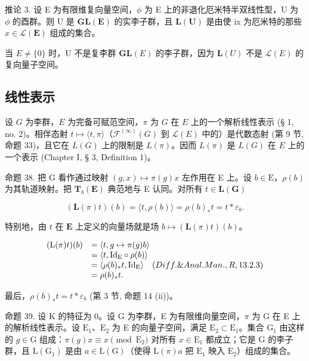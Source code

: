 推论 3. 设 E 为有限维复向量空间，\(\phi\) 为 E 上的非退化厄米特半双线性型，U 为 \(\phi\) 的酉群。则 U 是 \(\mathbf{GL}(\mathbf{E})\) 的实李子群，且 \(\mathbf{L}(\mathbf{U})\) 是由使 ix 为厄米特的那些 \(x \in \mathcal{L}(\mathbf{E})\) 组成的集合。

当 \(E \neq \{0\}\) 时，U 不是复李群 \(\mathbf{GL}(E)\) 的李子群，因为 \(\mathbf{L}(U)\) 不是 \(\mathcal{L}(E)\) 的复向量子空间。

\subsection{线性表示}

设 \(G\) 为李群，\(E\) 为完备可赋范空间，\(\pi\) 为 \(G\) 在 \(E\) 上的一个解析线性表示 (§ 1, no. 2)。相伴态射 \(t \mapsto \langle t, \pi \rangle\)（\(\mathcal{F}^{(\infty)}(G)\) 到 \(\mathcal{L}(E)\) 中的）是代数态射 (第 9 节, 命题 33)，且它在 \(L(G)\) 上的限制是 \(L(\pi)\)。因而 \(L(\pi)\) 是 \(L(G)\) 在 \(E\) 上的一个表示 (Chapter I, § 3, Definition 1)。

命题 38. 把 G 看作通过映射 \((g,x)\mapsto \pi (g)x\) 左作用在 E 上。设 \(b\in \mathrm{E}\)，\(\rho (b)\) 为其轨道映射。把 \(\mathbf{T}_b(\mathbf{E})\) 典范地与 E 认同。对所有 \(t\in \mathbf{L}(\mathbf{G})\)

\[
(\mathbf {L} (\pi) t) (b) = \langle t, \rho (b) \rangle = \rho (b) _ {*} t = t * \varepsilon_ {b}.
\]

特别地，由 \(t\) 在 \(\mathbf{E}\) 上定义的向量场就是场 \(b \mapsto (\mathbf{L}(\pi)t)(b)\)。

\[
\begin{array}{r l} (\mathrm{L} (\pi) t) (b) & = \langle t, g \mapsto \pi (g) b \rangle \\ & = \langle t, \mathrm{Id} _ {\mathrm{E}} \circ \rho (b) \rangle \\ & = \langle \rho (b) _ {*} t, \mathrm{Id} _ {\mathrm{E}} \rangle \quad (Diff. \& Anal. Man., R, 13.2.3) \\ & = \rho (b) _ {*} t. \end{array}
\]

最后，\(\rho(b)_{*}t = t*\varepsilon_{b}\) (第 3 节, 命题 14 (ii))。

命题 39. 设 K 的特征为 0。设 G 为李群，E 为有限维向量空间，\(\pi\) 为 G 在 E 上的解析线性表示。设 \(\mathrm{E}_1\)、\(\mathrm{E}_2\) 为 E 的向量子空间，满足 \(\mathrm{E}_2 \subset \mathrm{E}_1\)。集合 \(\mathrm{G}_1\) 由这样的 \(g \in \mathrm{G}\) 组成：\(\pi(g) x \equiv x \pmod{\mathrm{E}_2}\) 对所有 \(x \in \mathrm{E}_1\) 都成立；它是 G 的李子群，且 \(\mathrm{L}(\mathrm{G}_1)\) 是由 \(a \in \mathrm{L}(\mathrm{G})\)（使得 \(\mathrm{L}(\pi)a\) 把 \(\mathrm{E}_1\) 映入 \(\mathrm{E}_2\)）组成的集合。


